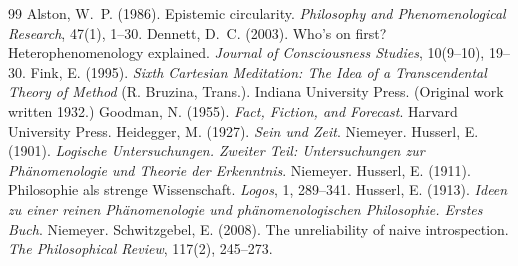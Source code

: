 \documentclass{situationist-preprint}
\begin{document}
\begin{thebibliography}{99}\small
{} Alston, W.~P. (1986). Epistemic circularity. \emph{Philosophy and Phenomenological Research}, 47(1), 1--30.
 Dennett, D.~C. (2003). Who's on first? Heterophenomenology explained. \emph{Journal of Consciousness Studies}, 10(9--10), 19--30.
 Fink, E. (1995). \emph{Sixth Cartesian Meditation: The Idea of a Transcendental Theory of Method} (R. Bruzina, Trans.). Indiana University Press. (Original work written 1932.)
 Goodman, N. (1955). \emph{Fact, Fiction, and Forecast}. Harvard University Press.
 Heidegger, M. (1927). \emph{Sein und Zeit}. Niemeyer.
 Husserl, E. (1901). \emph{Logische Untersuchungen. Zweiter Teil: Untersuchungen zur Phänomenologie und Theorie der Erkenntnis}. Niemeyer.
 Husserl, E. (1911). Philosophie als strenge Wissenschaft. \emph{Logos}, 1, 289--341.
 Husserl, E. (1913). \emph{Ideen zu einer reinen Phänomenologie und phänomenologischen Philosophie. Erstes Buch}. Niemeyer.
 Schwitzgebel, E. (2008). The unreliability of naive introspection. \emph{The Philosophical Review}, 117(2), 245--273.
\end{thebibliography}
\end{document}
